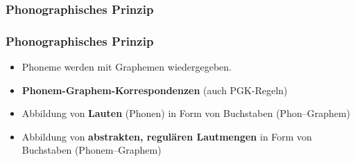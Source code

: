 \subsubsection{Phonographisches Prinzip}

\begin{frame}
\frametitle{Phonographisches Prinzip}

\begin{itemize}
	\item Phoneme werden mit Graphemen wiedergegeben.
	\item \textbf{Phonem-Graphem-Korrespondenzen} (auch PGK-Regeln)

\pause	

	\item Abbildung von \textbf{Lauten} (Phonen) in Form von Buchstaben (Phon--Graphem)\\ 
	\vs
	\item Abbildung von \textbf{abstrakten, regulären Lautmengen} in
Form von Buchstaben (Phonem--Graphem)

\end{itemize}

\end{frame}



